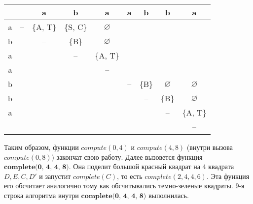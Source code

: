 \documentclass[russian,table]{article}
\begin{document}
\begin{table}[h]
\centering
\begin{tabular}{c|cccccccc}
 &  & a & b & a & a & b & b & a \\ \hline
a & \cellcolor[HTML]{00FF00}-- & \cellcolor[HTML]{00FF00}\{A, T\} & \cellcolor[HTML]{009901}\{S, C\} & \cellcolor[HTML]{009901}$\varnothing$ & \cellcolor[HTML]{FD6864} & \cellcolor[HTML]{FD6864} & \cellcolor[HTML]{FD6864} & \cellcolor[HTML]{FD6864} \\
b &  & \cellcolor[HTML]{00FF00}-- & \cellcolor[HTML]{009901}\{B\} & \cellcolor[HTML]{009901}$\varnothing$ & \cellcolor[HTML]{FD6864} & \cellcolor[HTML]{FD6864} & \cellcolor[HTML]{FD6864} & \cellcolor[HTML]{FD6864} \\
a &  &  & \cellcolor[HTML]{00FF00}-- & \cellcolor[HTML]{00FF00}\{A, T\} & \cellcolor[HTML]{FD6864} & \cellcolor[HTML]{FD6864} & \cellcolor[HTML]{FD6864} & \cellcolor[HTML]{FD6864} \\
a &  &  &  & \cellcolor[HTML]{00FF00}-- & \cellcolor[HTML]{FD6864} & \cellcolor[HTML]{FD6864} & \cellcolor[HTML]{FD6864} & \cellcolor[HTML]{FD6864} \\
b &  &  &  &  & \cellcolor[HTML]{00FF00}-- & \cellcolor[HTML]{00FF00}\{B\} & \cellcolor[HTML]{009901}$\varnothing$ & \cellcolor[HTML]{009901}$\varnothing$ \\
b &  &  &  &  &  & \cellcolor[HTML]{00FF00}-- & \cellcolor[HTML]{009901}\{B\} & \cellcolor[HTML]{009901}$\varnothing$ \\
a &  &  &  &  &  &  & \cellcolor[HTML]{00FF00}-- & \cellcolor[HTML]{00FF00}\{A, T\} \\
 &  &  &  &  &  &  &  & \cellcolor[HTML]{00FF00}--
\end{tabular}
\end{table}

Таким образом, функции $compute(0, 4)$ и $compute(4, 8)$ (внутри вызова $compute(0, 8)$) закончат свою работу. Далее вызовется функция $\textbf{complete(0, 4, 4, 8)}$.
Она поделит большой красный квадрат на 4 квадрата $D, E, C, D'$ и запустит $complete(C)$, то есть $complete(2,4,4,6)$. Эта функция его обсчитает аналогично тому как обсчитывались темно-зеленые квадраты. 9-я строка алгоритма внутри $\textbf{complete(0, 4, 4, 8)}$ выполнилась.
\end{document}
